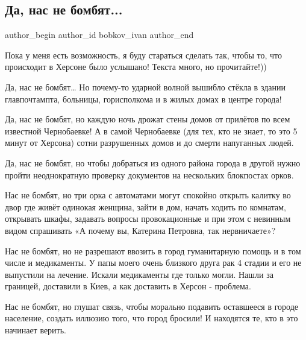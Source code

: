  
 
 
 
 
 
\subsection{Да, нас не бомбят...}
\label{sec:04_05_2022.fb.bobkov_ivan.1.nas_ne_bombjat}
 
\ifcmt
 author_begin
   author_id bobkov_ivan
 author_end
\fi

Пока у меня есть возможность, я буду стараться сделать так, чтобы то, что
происходит в Херсоне было услышано! Текста много, но прочитайте!))

Да, нас не бомбят… Но почему-то ударной волной вышибло стёкла в здании
главпочтампта, больницы, горисполкома и в жилых домах в центре города!

Да, нас не бомбят, но каждую ночь дрожат стены домов от прилётов по всем
известной Чернобаевке! А в самой Чернобаевке (для тех, кто не знает, то это 5
минут от Херсона) сотни разрушенных домов и до смерти напуганных людей.   

Да, нас не бомбят, но чтобы добраться из одного района города в другой нужно
пройти неоднократную проверку документов на нескольких блокпостах орков. 


Нас не бомбят, но три орка с автоматами могут спокойно открыть калитку во двор
где живёт одинокая женщина, зайти в дом, начать ходить по комнатам, открывать
шкафы, задавать вопросы провокационные и при этом с невинным видом спрашивать
«А почему вы, Катерина Петровна, так нервничаете»?

Нас не бомбят, но не разрешают ввозить в город гуманитарную помощь и в том
числе и медикаменты. У папы моего очень близкого друга рак 4 стадии и его не
выпустили на лечение. Искали медикаменты где только могли. Нашли за границей,
доставили в Киев, а как доставить в Херсон - проблема. 

Нас не бомбят, но глушат связь, чтобы морально подавить оставшееся в городе
население, создать иллюзию того, что город бросили! И находятся те, кто в это
начинает верить. 

